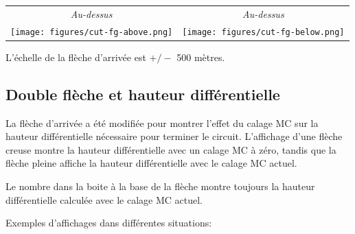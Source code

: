 \begin{center}
\begin{tabular}{c c}
{\it Au-dessus} & {\it Au-dessus} \\
\texttt{[image: figures/cut-fg-above.png]} &
\texttt{[image: figures/cut-fg-below.png]} \\
\end{tabular}
\end{center}

L'échelle de la flèche d'arrivée est $+/-$ 500 mètres.

\subsection*{Double flèche et hauteur différentielle}

La flèche d'arrivée a été modifiée pour montrer l'effet du calage MC sur la hauteur différentielle nécessaire pour terminer le circuit. L'affichage d'une flèche creuse montre la hauteur différentielle avec un calage MC à zéro, tandis que la flèche pleine affiche la hauteur différentielle avec le calage MC actuel.

Le nombre dans la boite à la base de la flèche montre toujours la hauteur différentielle calculée avec le calage MC actuel.

Exemples d'affichages dans différentes situations:

